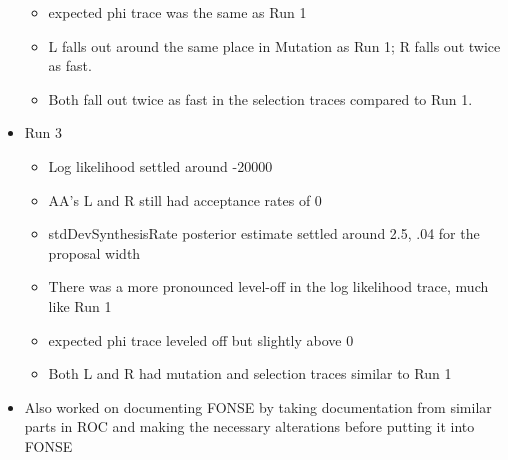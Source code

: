 \documentclass[11pt]{labbook}
\begin{document}
\begin{itemize}
\begin{itemize}
            \item expected phi trace was the same as Run 1
            \item L falls out around the same place in Mutation as Run 1; R falls out twice as fast.
            \item Both fall out twice as fast in the selection traces compared to Run 1.
        \end{itemize}
        \item Run 3
        \begin{itemize}
            \item Log likelihood settled around -20000
            \item AA's L and R still had acceptance rates of 0
            \item stdDevSynthesisRate posterior estimate settled around 2.5, .04 for the proposal width
            \item There was a more pronounced level-off in the log likelihood trace, much like Run 1
            \item expected phi trace leveled off but slightly above 0
            \item Both L and R had mutation and selection traces similar to Run 1
        \end{itemize}
        \item Also worked on documenting FONSE by taking documentation from similar parts in ROC and making the necessary alterations before putting it into FONSE
         

\end{itemize}
\end{document}
